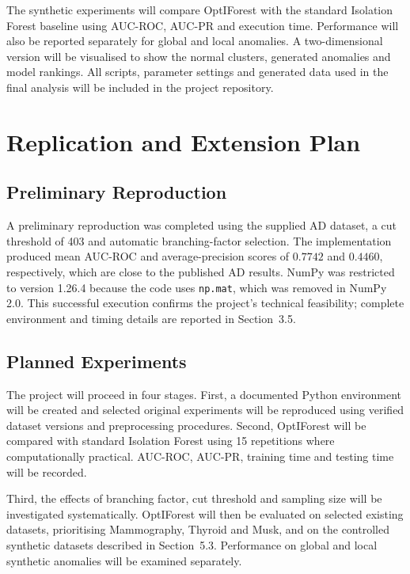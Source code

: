 \documentclass[11pt]{article}
\begin{document}
The synthetic experiments will compare OptIForest with the standard
Isolation Forest baseline using AUC-ROC, AUC-PR and execution time.
Performance will also be reported separately for global and local
anomalies. A two-dimensional version will be visualised to show the
normal clusters, generated anomalies and model rankings. All scripts,
parameter settings and generated data used in the final analysis will be
included in the project repository.

\section{Replication and Extension Plan}

\subsection{Preliminary Reproduction}

A preliminary reproduction was completed using the supplied AD dataset,
a cut threshold of 403 and automatic branching-factor selection. The
implementation produced mean AUC-ROC and average-precision scores of
\(0.7742\) and \(0.4460\), respectively, which are close to the published
AD results. NumPy was restricted to version 1.26.4 because the code uses
\texttt{np.mat}, which was removed in NumPy 2.0. This successful execution
confirms the project's technical feasibility; complete environment and
timing details are reported in Section~3.5.

\subsection{Planned Experiments}

The project will proceed in four stages. First, a documented Python
environment will be created and selected original experiments will be
reproduced using verified dataset versions and preprocessing procedures.
Second, OptIForest will be compared with standard Isolation Forest using
15 repetitions where computationally practical. AUC-ROC, AUC-PR,
training time and testing time will be recorded.

Third, the effects of branching factor, cut threshold and sampling size
will be investigated systematically. OptIForest will then be evaluated
on selected existing datasets, prioritising Mammography, Thyroid and
Musk, and on the controlled synthetic datasets described in
Section~5.3. Performance on global and local synthetic anomalies will be
examined separately.
\end{document}
